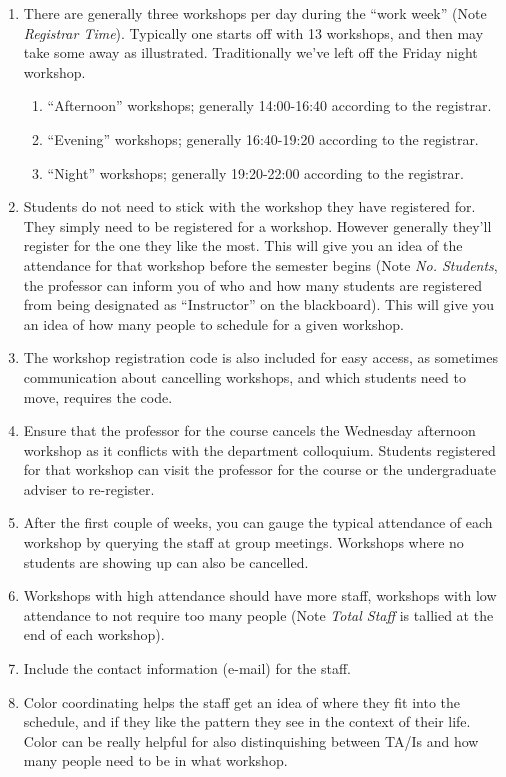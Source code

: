 \documentclass[12pt]{article}
\begin{document}
\begin{enumerate}
	\item There are generally three workshops per day during the ``work week'' (Note \emph{Registrar Time}). Typically one starts off with 13 workshops, and then may take some away as illustrated. Traditionally we've left off the Friday night workshop.
		\begin{enumerate}
			\item ``Afternoon'' workshops; generally 14:00-16:40 according to the registrar.
			\item ``Evening'' workshops; generally 16:40-19:20 according to the registrar.
			\item ``Night'' workshops; generally 19:20-22:00 according to the registrar.
		\end{enumerate}
	\item Students do not need to stick with the workshop they have registered for. They simply need to be registered for a workshop. However generally they'll register for the one they like the most. This will give you an idea of the attendance for that workshop before the semester begins (Note \emph{No. Students}, the professor can inform you of who and how many students are registered from being designated as ``Instructor'' on the blackboard). This will give you an idea of how many people to schedule for a given workshop.
	\item The workshop registration code is also included for easy access, as sometimes communication about cancelling workshops, and which students need to move, requires the code.
	\item Ensure that the professor for the course cancels the Wednesday afternoon workshop as it conflicts with the department colloquium. Students registered for that workshop can visit the professor for the course or the undergraduate adviser to re-register.
	\item After the first couple of weeks, you can gauge the typical attendance of each workshop by querying the staff at group meetings. Workshops where no students are showing up can also be cancelled.
	\item Workshops with high attendance should have more staff, workshops with low attendance to not require too many people (Note \emph{Total Staff} is tallied at the end of each workshop).
	\item Include the contact information (e-mail) for the staff.
	\item Color coordinating helps the staff get an idea of where they fit into the schedule, and if they like the pattern they see in the context of their life. Color can be really helpful for also distinquishing between TA/Is and how many people need to be in what workshop.
\end{enumerate}
\end{document}
